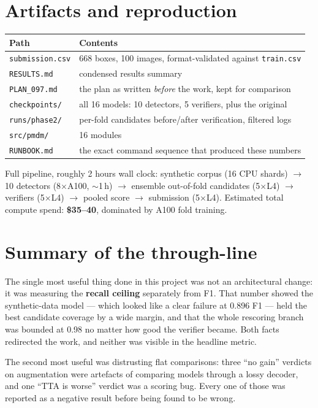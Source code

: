 \documentclass[11pt,a4paper]{article}
\begin{document}
\section{Artifacts and reproduction}

\begin{table}[h!]
\centering
\small
\renewcommand{\arraystretch}{1.2}
\begin{tabular}{@{}p{4.6cm}p{10.4cm}@{}}
\toprule
\textbf{Path} & \textbf{Contents} \\
\midrule
\texttt{submission.csv} & 668 boxes, 100 images, format-validated against \texttt{train.csv} \\
\texttt{RESULTS.md} & condensed results summary \\
\texttt{PLAN\_097.md} & the plan as written \emph{before} the work, kept for comparison \\
\texttt{checkpoints/} & all 16 models: 10 detectors, 5 verifiers, plus the original \\
\texttt{runs/phase2/} & per-fold candidates before/after verification, filtered logs \\
\texttt{src/pmdm/} & 16 modules \\
\texttt{RUNBOOK.md} & the exact command sequence that produced these numbers \\
\bottomrule
\end{tabular}
\end{table}

Full pipeline, roughly 2 hours wall clock: synthetic corpus (16 CPU shards) $\rightarrow$ 10
detectors (8$\times$A100, $\sim$1\,h) $\rightarrow$ ensemble out-of-fold candidates (5$\times$L4)
$\rightarrow$ verifiers (5$\times$L4) $\rightarrow$ pooled score $\rightarrow$ submission
(5$\times$L4). Estimated total compute spend: \textbf{\$35--40}, dominated by A100 fold training.

\section{Summary of the through-line}

The single most useful thing done in this project was not an architectural change: it was measuring
the \textbf{recall ceiling} separately from F1. That number showed the synthetic-data model ---
which looked like a clear failure at 0.896 F1 --- held the best candidate coverage by a wide
margin, and that the whole rescoring branch was bounded at 0.98 no matter how good the verifier
became. Both facts redirected the work, and neither was visible in the headline metric.

The second most useful was distrusting flat comparisons: three ``no gain'' verdicts on augmentation
were artefacts of comparing models through a lossy decoder, and one ``TTA is worse'' verdict was a
scoring bug. Every one of those was reported as a negative result before being found to be wrong.
\end{document}
